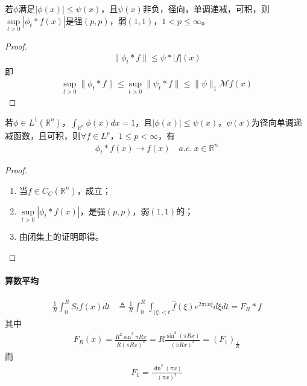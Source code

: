 \begin{Corollary}
    若$\phi$满足$|\phi(x)|\leqslant \psi(x)$，且$\psi(x)$非负，径向，单调递减，可积，则$\sup\limits_{t>0}|\phi_t * f(x)|$是强$(p,p)$，弱$(1,1)$，$1<p\leqslant \infty$。
\end{Corollary}
\begin{proof}
    \begin{align*}
        \|\phi_t * f\| \leqslant \psi * |f|(x) 
    \end{align*}
    即
    \begin{align*}
        \sup\limits_{t>0} \|\phi_t * f\| \leqslant \sup\limits_{t>0} \|\psi_t * f\| \leqslant \|\psi\|_1 \mathcal{M} f(x)
    \end{align*}
\end{proof}

\begin{theorem}
    若$\phi\in L^1(\mathbb{R}^n)$，$\int_{\mathbb{R}^n} \phi(x) dx = 1$，且$|\phi(x)| \leqslant \psi(x)$，$\psi(x)$为径向单调递减函数，且可积，则$\forall f\in L^p$，$1\leqslant p<\infty$，有
    \begin{align*}
        \phi_t * f(x) \to f(x) \quad a.e.\ x\in\mathbb{R}^n
    \end{align*}
\end{theorem}
\begin{proof}
    \begin{enumerate}[leftmargin=1cm, label=\arabic*${}^{\circ}$]
        \item 当$f\in C_C(\mathbb{R}^n)$，成立；
        \item $\sup\limits_{t>0} |\phi_t * f(x)|$，是强$(p,p)$，弱$(1,1)$的；
        \item 由闭集上的证明即得。
    \end{enumerate}
\end{proof}

\paragraph{算数平均}
\begin{align*}
    \frac{1}{R} \int_0^R S_t f(x) dt &\triangleq \frac{1}{R} \int_0^R \int_{|\xi| < t} \widehat{f}(\xi) e^{2\pi i x \xi} d\xi dt = F_R * f 
\end{align*}
其中
\begin{align*}
    F_R(x) = \frac{R^2 \sin^2 \pi R x}{R(\pi R x)^2} = R \frac{\sin^2(\pi R x)}{(\pi R x)^2} = (F_1)_{\frac{1}{R}}
\end{align*}
而
\begin{align*}
    F_1 = \frac{\sin^2(\pi x)}{(\pi x)^2}
\end{align*}


